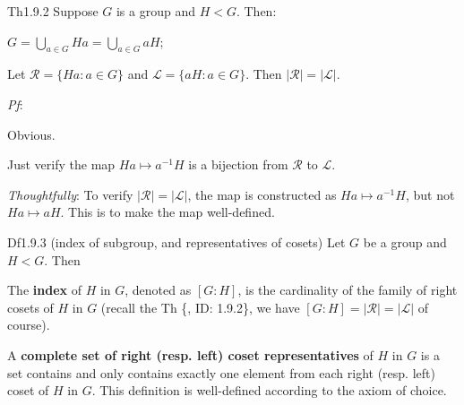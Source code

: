 \documentclass{article}
\begin{document}
\begin{Th}{Th1.9.2}
    Suppose $G$ is a group and $H<G$. Then:
    \begin{compactenum}
        \item $G = \bigcup_{a\in G} Ha = \bigcup_{a\in G} aH$;
        \item Let $\mathcal{R} = \{Ha: a\in G\}$ and $\mathcal{L} = \{aH: a\in G\}$. Then $|\mathcal{R}| = |\mathcal{L}|$. 
    \end{compactenum}
    \tcblower
    \textit{Pf}:
    \begin{compactenum}
        \item Obvious.
        \item Just verify the map $Ha\mapsto a^{-1}H$ is a bijection from $\mathcal{R}$ to $\mathcal{L}$.
    \end{compactenum}
    \textcolor{P}{\textit{Thoughtfully}: To verify $|\mathcal{R}| = |\mathcal{L}|$, the map is constructed as $Ha\mapsto a^{-1}H$, but not $Ha\mapsto aH$. This is to make the map well-defined.}
\end{Th}

\begin{Df}{Df1.9.3 (index of subgroup, and representatives of cosets)}
    Let $G$ be a group and $H<G$. Then 
    \begin{compactenum}
        \item The \textbf{index} of $H$ in $G$, denoted as $[G:H]$, is the cardinality of the family of right cosets of $H$ in $G$ (recall the Th \{, ID: 1.9.2\}, we have $[G:H] = |\mathcal{R}| = |\mathcal{L}|$ of course).
        \item A \textbf{complete set of right (resp. left) coset representatives} of $H$ in $G$ is a set contains and only contains exactly one element from each right (resp. left) coset of $H$ in $G$. This definition is well-defined according to the axiom of choice.
    \end{compactenum}
\end{Df}
\end{document}
